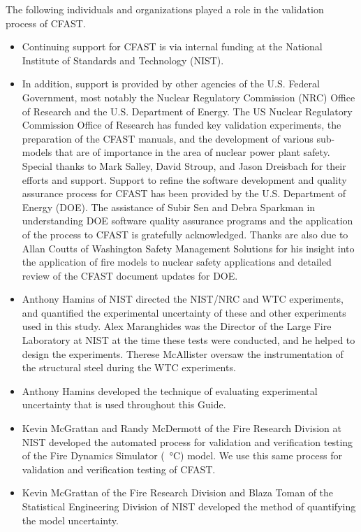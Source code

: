 \documentclass[12pt]{book}
\begin{document}
The following individuals and organizations played a role in the validation process of CFAST.
\begin{itemize}
\item Continuing support for CFAST is via internal funding at the National Institute of Standards and Technology (NIST).

\item In addition, support is provided by other agencies of the U.S. Federal Government, most notably the Nuclear Regulatory Commission (NRC) Office of Research and the U.S. Department of Energy. The US Nuclear Regulatory Commission Office of Research has funded key validation experiments, the preparation of the CFAST manuals, and the development of various sub-models that are of importance in the area of nuclear power plant safety. Special thanks to Mark Salley, David Stroup, and Jason Dreisbach for their efforts and support. Support to refine the software development and quality assurance process for CFAST has been provided by the U.S. Department of Energy (DOE). The assistance of Subir Sen and Debra Sparkman in understanding DOE software quality assurance programs and the application of the process to CFAST is gratefully acknowledged.  Thanks are also due to Allan Coutts of Washington Safety Management Solutions for his insight into the application of fire models to nuclear safety applications and detailed review of the CFAST document updates for DOE.

\item Anthony Hamins of NIST directed the NIST/NRC and WTC experiments, and quantified the experimental uncertainty of these and other experiments used in this study. Alex Maranghides was the Director of the Large Fire Laboratory at NIST at the time these tests were conducted, and he helped to design the experiments. Therese McAllister oversaw the instrumentation of the structural steel during the WTC experiments.

\item Anthony Hamins developed the technique of evaluating experimental uncertainty that is used throughout this Guide.

\item Kevin McGrattan and Randy McDermott of the Fire Research Division at NIST developed the automated process for validation and verification testing of the Fire Dynamics Simulator (~\unit{\degreeCelsius}) model.  We use this same process for validation and verification testing of CFAST.

\item Kevin McGrattan of the Fire Research Division and Blaza Toman of the Statistical Engineering Division of NIST developed the method of quantifying the model uncertainty.


\end{itemize}
\end{document}
